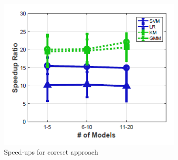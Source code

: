 \begin{figure}[h]
\begin{subfigure}{0.2\textwidth}
        \includegraphics[height = 1.2\textwidth, width=1.2\textwidth]{Figures/model_reuse_coreset_speed_up.png}
    \caption{Speed-ups for coreset approach}
    \label{fig:model_reuse3}
    \end{subfigure}
    \hfill
    \begin{subfigure}{0.2\textwidth}

\end{subfigure}
\end{figure}
